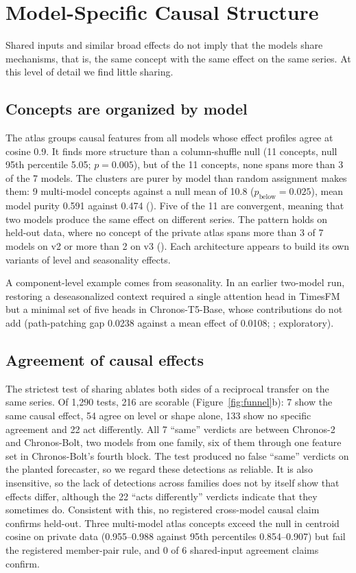 \section{Model-Specific Causal Structure}
\label{sec:mechanisms}

Shared inputs and similar broad effects do not imply that the models share mechanisms, that is, the same concept with
the same effect on the same series. At this level of detail we find little sharing.

\subsection{Concepts are organized by model}
\label{sec:bymodel}

The atlas groups causal features from all models whose effect profiles agree at cosine 0.9. It finds more structure than
a column-shuffle null (11 concepts, null 95th percentile 5.05; $p=0.005$), but of the 11 concepts, none spans more than 3
of the 7 models. The clusters are purer by model than random assignment makes them: 9 multi-model concepts against a
null mean of 10.8 ($p_{\text{below}}=0.025$), mean model purity 0.591 against 0.474 (). Five of the 11 are
convergent, meaning that two models produce the same effect on different series. The pattern holds on held-out data, where no concept of the
private atlas spans more than 3 of 7 models on v2 or more than 2 on v3 (). Each architecture appears to
build its own variants of level and seasonality effects.

A component-level example comes from seasonality. In an earlier two-model run, restoring a deseasonalized context
required a single attention head in TimesFM but a minimal set of five heads in Chronos-T5-Base, whose contributions do
not add (path-patching gap 0.0238
against a mean effect of 0.0108; ; exploratory).

\subsection{Agreement of causal effects}
\label{sec:sameeffect}

The strictest test of sharing ablates both sides of a reciprocal transfer on the same series. Of 1{,}290 tests, 216 are scorable
(Figure~\ref{fig:funnel}b): 7 show the same causal effect, 54 agree on level or shape alone, 133 show no specific
agreement and 22 act differently. All 7 ``same'' verdicts are between Chronos-2 and Chronos-Bolt, two models from one
family, six of them through one feature set in Chronos-Bolt's fourth block. The test produced no false
``same'' verdicts on the planted forecaster, so we regard these detections as reliable. It is also insensitive, so the
lack of detections across families does not by itself show that effects differ, although the 22 ``acts differently''
verdicts indicate that they sometimes do. Consistent with this, no registered cross-model causal claim confirms held-out. Three multi-model atlas concepts exceed the
null in centroid cosine on private data (0.955--0.988 against 95th percentiles 0.854--0.907) but fail the registered
member-pair rule, and 0 of 6 shared-input agreement claims confirm.

